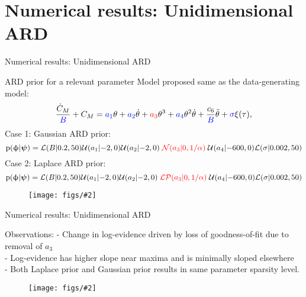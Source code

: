 \documentclass[xcolor=dvipsnames,10pt]{beamer}
\newcommand{\df}{\displaystyle\frac}
\newcommand{\U}{\mathcal{U}}
\def\bpsi{\mbox{\boldmath $\psi$}}
\newcommand{\cL}{\mathcal{L}}
\newcommand{\pL}{\mathcal{LP}}
\newcommand{\N}{\mathcal{N}}
\def\th{\ensuremath{\theta}}
\def\dth{\ensuremath{\dot{\theta}}}
\def\ddth{\ensuremath{\ddot{\theta}}}
\def\prob{\mbox{$\text{p}$}}
\def\bphi{\mbox{\ensuremath{\upphi}}}
\newcommand{\beq}{\begin{equation}}
\newcommand{\eeq}{\end{equation}}
\def\Cm{\ensuremath{\text{C}_{m}(\th)}}
\def\dCm{\mbox{$\dot{C}_{M}$}}
\def\Cm{\ensuremath{C_{M}}}
\newcommand{\newfigure}[2]{\begin{figure}\centering 
\texttt{[image: figs/\#2]}\end{figure}\vspace{-0.2in}}
\newcommand{\red}[1]{{\textcolor{red}{#1}}}
\newcommand{\blue}[1]{{\textcolor{blue}{#1}}}
\newcommand{\newblockb}[2]{\begin{block}{#1} \small #2 \end{block}}
\begin{document}
\section{Numerical results: Unidimensional ARD}
\begin{frame}{Numerical results: Unidimensional ARD}
\newblockb{ARD prior for a relevant parameter}{Model proposed same as the data-generating model:
\beq \label{eq:aODE}
\df{\dCm}{\blue{B}} + \Cm = \blue{a_1} \th + \blue{a_2} \dth + \red{a_3} \th^3 + \blue{a_4} \th^2 \dth + \df{c_6}{\blue{B}} \ddth  + \blue{\sigma} \xi(\tau) ,
\eeq
Case 1: Gaussian ARD prior:
\beq
\prob(\bphi|\bpsi) = \cL(B|0.2, 50) \U(a_1| {-2},0)\U(a_2| {-2},0) \; \red{\N(a_3|0,1/\alpha)} \; \U(a_4|{-600},0)\cL(\sigma |0.002,50)
\eeq
Case 2: Laplace ARD prior:
\beq
\prob(\bphi|\bpsi) = \cL(B|0.2, 50) \U(a_1| {-2},0)\U(a_2| {-2},0) \; \red{\pL(a_3|0,1/\alpha)} \; \U(a_4|{-600},0)\cL(\sigma |0.002,50)
\eeq}
\newfigure{0.25}{gauss_vs_laplace.eps}
\end{frame}

\begin{frame}{Numerical results: Unidimensional ARD}
\newblockb{Observations:}{
- Change in log-evidence driven by loss of goodness-of-fit due to removal of $a_3$\\
- Log-evidence has higher slope near maxima and is minimally sloped elsewhere\\
- Both Laplace prior and Gaussian prior results in same parameter sparsity level.   
}
\newfigure{0.65}{uni/fig_E01.eps}
\end{frame}

%
\end{document}

